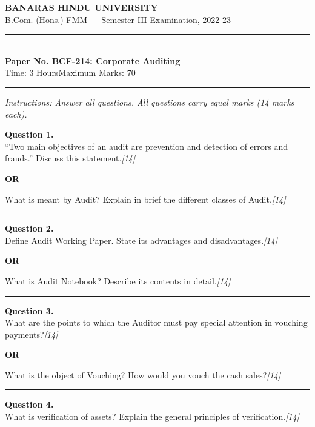 \documentclass[11pt,a4paper]{article}
\newcommand{\pts}[1]{\hfill   \textit{[#1]}}
\begin{document}
\begin{center}
  {\large\bfseries BANARAS HINDU UNIVERSITY}\\[2pt]
  {\normalsize B.Com. (Hons.) FMM --- Semester III Examination, 2022-23}\\[6pt]
  \rule{0.8\linewidth}{0.5pt}\\[6pt]
  {\large\bfseries Paper No. BCF-214: Corporate Auditing}\\[4pt]
  {\normalsize Time: 3 Hours\hfill Maximum Marks: 70}
\end{center}

\rule{\linewidth}{0.4pt}

\smallskip



\noindent   \textit{Instructions: Answer all questions. All questions carry equal marks (14 marks each).}

\bigskip




\noindent   \textbf{Question 1.} \\
``Two main objectives of an audit are prevention and detection of errors and frauds.'' Discuss this statement.\pts{14}

\centerline{   \textbf{OR}}

What is meant by Audit? Explain in brief the different classes of Audit.\pts{14}

\medskip\rule{\linewidth}{0.2pt}




\noindent   \textbf{Question 2.} \\
Define Audit Working Paper. State its advantages and disadvantages.\pts{14}

\centerline{   \textbf{OR}}

What is Audit Notebook? Describe its contents in detail.\pts{14}

\medskip\rule{\linewidth}{0.2pt}




\noindent   \textbf{Question 3.} \\
What are the points to which the Auditor must pay special attention in vouching payments?\pts{14}

\centerline{   \textbf{OR}}

What is the object of Vouching? How would you vouch the cash sales?\pts{14}

\medskip\rule{\linewidth}{0.2pt}




\noindent   \textbf{Question 4.} \\
What is verification of assets? Explain the general principles of verification.\pts{14}
\end{document}

